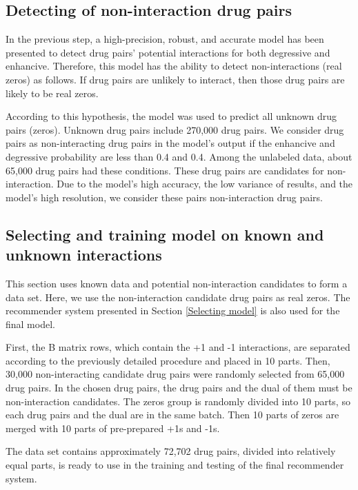 \documentclass{bmcart}
\begin{document}
\subsection*{Detecting of non-interaction drug pairs}
In the previous step, a high-precision, robust, and accurate model has been presented to detect drug pairs' potential interactions for both degressive and enhancive. Therefore, this model has the ability to detect non-interactions (real zeros) as follows. If drug pairs are unlikely to interact, then those drug pairs are likely to be real zeros.

According to this hypothesis, the model was used to predict all unknown drug pairs (zeros). Unknown drug pairs include 270,000 drug pairs. We consider drug pairs as non-interacting drug pairs in the model's output if the enhancive and degressive probability are less than 0.4 and 0.4. Among the unlabeled data, about 65,000 drug pairs had these conditions. These drug pairs are candidates for non-interaction. Due to the model's high accuracy, the low variance of results, and the model's high resolution, we consider these pairs non-interaction drug pairs.

\subsection*{Selecting and training model on known and unknown interactions}
This section uses known data and potential non-interaction candidates to form a data set. Here, we use the non-interaction candidate drug pairs as real zeros. The recommender system presented in Section \ref{Selecting model} is also used for the final model.

First, the B matrix rows, which contain the +1 and -1 interactions, are separated according to the previously detailed procedure and placed in 10 parts. Then, 30,000 non-interacting candidate drug pairs were randomly selected from 65,000 drug pairs. In the chosen drug pairs, the drug pairs and the dual of them must be non-interaction candidates. The zeros group is randomly divided into 10 parts, so each drug pairs and the dual are in the same batch. Then 10 parts of zeros are merged with 10 parts of pre-prepared +1s and -1s. 

The data set contains approximately 72,702 drug pairs, divided into relatively equal parts, is ready to use in the training and testing of the final recommender system.
\end{document}
